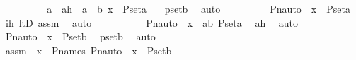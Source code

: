 \begin{isabellebody}
\ \ \ \ \ \ \isamarkupfalse%
\ \isamarkupfalse%
\ a\ \ ah\ {\isacharcolon}{\kern0pt}\ {\isachardoublequoteopen}a\ {\isacharless}{\kern0pt}\ b{\isachardoublequoteclose}\ {\isachardoublequoteopen}x\ {\isasymin}\ P{\isacharunderscore}{\kern0pt}set{\isacharparenleft}{\kern0pt}a{\isacharparenright}{\kern0pt}{\isachardoublequoteclose}\ \ \isamarkupfalse%
\ psetb\ \isamarkupfalse%
\ auto\isanewline
\ \ \ \ \ \ \isamarkupfalse%
\ \isamarkupfalse%
\ {\isachardoublequoteopen}Pn{\isacharunderscore}{\kern0pt}auto{\isacharparenleft}{\kern0pt}{\isasympi}{\isacharparenright}{\kern0pt}\ {\isacharbackquote}{\kern0pt}\ x\ {\isasymin}\ P{\isacharunderscore}{\kern0pt}set{\isacharparenleft}{\kern0pt}a{\isacharparenright}{\kern0pt}{\isachardoublequoteclose}\ \isamarkupfalse%
\ ih\ ltD\ assm\ \isamarkupfalse%
\ auto\ \isanewline
\ \ \ \ \ \ \isamarkupfalse%
\ \isamarkupfalse%
\ {\isachardoublequoteopen}Pn{\isacharunderscore}{\kern0pt}auto{\isacharparenleft}{\kern0pt}{\isasympi}{\isacharparenright}{\kern0pt}\ {\isacharbackquote}{\kern0pt}\ x\ {\isasymin}\ {\isacharparenleft}{\kern0pt}{\isasymUnion}a{\isacharless}{\kern0pt}b{\isachardot}{\kern0pt}\ P{\isacharunderscore}{\kern0pt}set{\isacharparenleft}{\kern0pt}a{\isacharparenright}{\kern0pt}{\isacharparenright}{\kern0pt}{\isachardoublequoteclose}\ \isamarkupfalse%
\ ah\ \isamarkupfalse%
\ auto\ \isanewline
\ \ \ \ \ \ \isamarkupfalse%
\ \isamarkupfalse%
\ {\isachardoublequoteopen}Pn{\isacharunderscore}{\kern0pt}auto{\isacharparenleft}{\kern0pt}{\isasympi}{\isacharparenright}{\kern0pt}\ {\isacharbackquote}{\kern0pt}\ x\ {\isasymin}\ P{\isacharunderscore}{\kern0pt}set{\isacharparenleft}{\kern0pt}b{\isacharparenright}{\kern0pt}{\isachardoublequoteclose}\ \isamarkupfalse%
\ psetb\ \isamarkupfalse%
\ auto\isanewline
\ \ \ \ \isamarkupfalse%
\ \isanewline
\ \ \ \ \ \ \isamarkupfalse%
\ assm\ {\isacharcolon}{\kern0pt}\ {\isachardoublequoteopen}x\ {\isasymin}\ P{\isacharunderscore}{\kern0pt}names{\isachardoublequoteclose}\ {\isachardoublequoteopen}Pn{\isacharunderscore}{\kern0pt}auto{\isacharparenleft}{\kern0pt}{\isasympi}{\isacharparenright}{\kern0pt}\ {\isacharbackquote}{\kern0pt}\ x\ {\isasymin}\ P{\isacharunderscore}{\kern0pt}set{\isacharparenleft}{\kern0pt}b{\isacharparenright}{\kern0pt}{\isachardoublequoteclose}\ \isanewline

\end{isabellebody}

